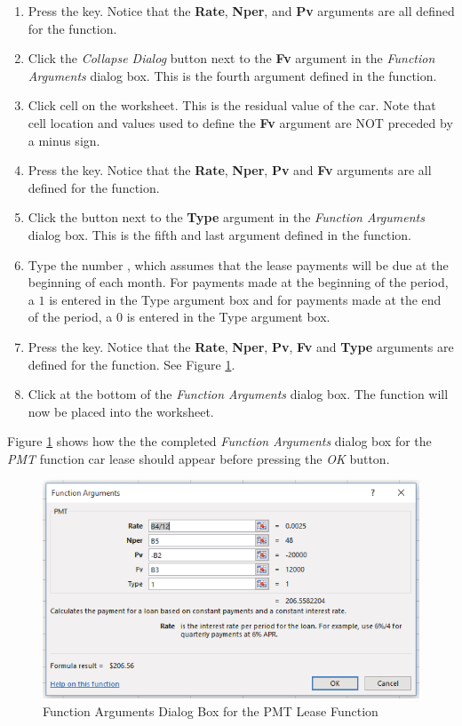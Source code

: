 \begin{enumerate}
	\item Press the  key. Notice that the \textbf{Rate}, \textbf{Nper}, and \textbf{Pv} arguments are all defined for the function.
	\item Click the \textit{Collapse Dialog} button next to the \textbf{Fv} argument in the \textit{Function Arguments} dialog box. This is the fourth argument defined in the function.
	\item Click cell  on the worksheet. This is the residual value of the car. Note that cell location and values used to define the \textbf{Fv} argument are NOT preceded by a minus sign.
	\item Press the  key. Notice that the \textbf{Rate}, \textbf{Nper}, \textbf{Pv} and \textbf{Fv} arguments are all defined for the function.
	\item Click the  button next to the \textbf{Type} argument in the \textit{Function Arguments} dialog box. This is the fifth and last argument defined in the function.
	\item Type the number , which assumes that the lease payments will be due at the beginning of each month. For payments made at the beginning of the period, a $ 1 $ is entered in the Type argument box and for payments made at the end of the period, a $ 0 $ is entered in the Type argument box.
	\item Press the  key. Notice that the \textbf{Rate}, \textbf{Nper}, \textbf{Pv}, \textbf{Fv} and \textbf{Type} arguments are defined for the function. See Figure \ref{02:fig34}.
	\item Click  at the bottom of the \textit{Function Arguments} dialog box. The function will now be placed into the worksheet.
\end{enumerate}

Figure \ref{02:fig34} shows how the the completed \textit{Function Arguments} dialog box for the \textit{PMT} function car lease should appear before pressing the \textit{OK} button.

\begin{figure}[H]
	\centering
	\includegraphics[width=\maxwidth{.95\linewidth}]{gfx/ch02_fig34}
	\caption{Function Arguments Dialog Box for the PMT Lease Function}
	\label{02:fig34}
\end{figure}

